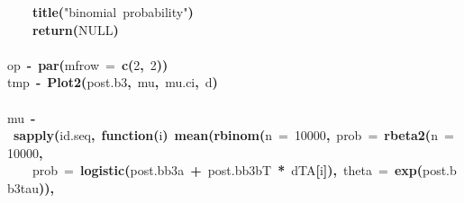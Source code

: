 \documentclass{article}
\makeatletter
\newcommand{\hlnumber}[1]{\textcolor[rgb]{0,0,0}{#1}}%
\newcommand{\hlfunctioncall}[1]{\textcolor[rgb]{.5,0,.33}{\textbf{#1}}}%
\newcommand{\hlstring}[1]{\textcolor[rgb]{.6,.6,1}{#1}}%
\newcommand{\hlkeyword}[1]{\textbf{#1}}%
\newcommand{\hlargument}[1]{\textcolor[rgb]{.69,.25,.02}{#1}}%
\newcommand{\hlformalargs}[1]{\hlargument{#1}}%
\newcommand{\hlassignement}[1]{\textbf{#1}}%
\newcommand{\hlsymbol}[1]{#1}%
\newcommand{\hlstd}[1]{\textcolor[rgb]{0,0,0}{#1}}%
\newenvironment{kframe}{%
 \def\FrameCommand##1{\hskip\@totalleftmargin \hskip-\fboxsep
 \colorbox{shadecolor}{##1}\hskip-\fboxsep
     \hskip-\linewidth \hskip-\@totalleftmargin \hskip\columnwidth}%
 \MakeFramed {\advance\hsize-\width
   \@totalleftmargin\z@ \linewidth\hsize
   \@setminipage}}%
 {\par\unskip\endMakeFramed}
\newenvironment{knitrout}{}{} %
\makeatother
\begin{document}
\begin{knitrout}
{\begin{kframe}
\begin{flushleft}
\hlstd{}{\ }{\ }{\ }{\ }\hlfunctioncall{title}\hlkeyword{(}\hlstring{"binomial{\ }probability"}\hlkeyword{)}\hspace*{\fill}\\
\hlstd{}{\ }{\ }{\ }{\ }\hlfunctioncall{return}\hlkeyword{(}NULL\hlkeyword{)}\hspace*{\fill}\\
\hlstd{}\hlkeyword{\usebox{\hlnormalsizeboxclosebrace}}\hspace*{\fill}\\
\hlstd{}\hlsymbol{op}{\ }\hlassignement{\usebox{\hlnormalsizeboxlessthan}-}{\ }\hlfunctioncall{par}\hlkeyword{(}\hlargument{mfrow}{\ }\hlargument{=}{\ }\hlfunctioncall{c}\hlkeyword{(}\hlnumber{2}\hlkeyword{,}{\ }\hlnumber{2}\hlkeyword{)}\hlkeyword{)}\hspace*{\fill}\\
\hlstd{}\hlsymbol{tmp}{\ }\hlassignement{\usebox{\hlnormalsizeboxlessthan}-}{\ }\hlfunctioncall{Plot2}\hlkeyword{(}\hlsymbol{post.b3}\hlkeyword{,}{\ }\hlsymbol{mu}\hlkeyword{,}{\ }\hlsymbol{mu.ci}\hlkeyword{,}{\ }\hlsymbol{d}\hlkeyword{)}\hspace*{\fill}\\
\hlstd{}\hspace*{\fill}\\
\hlstd{}\hlsymbol{mu}{\ }\hlassignement{\usebox{\hlnormalsizeboxlessthan}-}{\ }\hlfunctioncall{sapply}\hlkeyword{(}\hlsymbol{id.seq}\hlkeyword{,}{\ }\hlkeyword{function}\hlkeyword{(}\hlformalargs{i}\hlkeyword{)}{\ }\hlfunctioncall{mean}\hlkeyword{(}\hlfunctioncall{rbinom}\hlkeyword{(}\hlargument{n}{\ }\hlargument{=}{\ }\hlnumber{10000}\hlkeyword{,}{\ }\hlargument{prob}{\ }\hlargument{=}{\ }\hlfunctioncall{rbeta2}\hlkeyword{(}\hlargument{n}{\ }\hlargument{=}{\ }\hlnumber{10000}\hlkeyword{,}\hspace*{\fill}\\
\hlstd{}{\ }{\ }{\ }{\ }\hlargument{prob}{\ }\hlargument{=}{\ }\hlfunctioncall{logistic}\hlkeyword{(}\hlsymbol{post.bb3}\hlkeyword{\usebox{\hlnormalsizeboxdollar}}\hlsymbol{a}{\ }\hlkeyword{+}{\ }\hlsymbol{post.bb3}\hlkeyword{\usebox{\hlnormalsizeboxdollar}}\hlsymbol{bT}{\ }\hlkeyword{*}{\ }\hlsymbol{d}\hlkeyword{\usebox{\hlnormalsizeboxdollar}}\hlsymbol{TA}\hlkeyword{[}\hlsymbol{i}\hlkeyword{]}\hlkeyword{)}\hlkeyword{,}{\ }\hlargument{theta}{\ }\hlargument{=}{\ }\hlfunctioncall{exp}\hlkeyword{(}\hlsymbol{post.bb3}\hlkeyword{\usebox{\hlnormalsizeboxdollar}}\hlsymbol{tau}\hlkeyword{)}\hlkeyword{)}\hlkeyword{,}\hspace*{\fill}\\

\end{flushleft}
\end{kframe}}
\end{knitrout}
\end{document}
